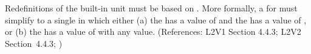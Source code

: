 Redefinitions of the built-in unit  must be based on
.  More formally, a \UnitDefinition for  must
simplify to a single \Unit in which either (a) the 
 has a value of  and the 
 has a value of , or (b) the 
 has a value of  with any
 value.  (References: L2V1 Section 4.4.3; L2V2
Section~4.4.3; )
